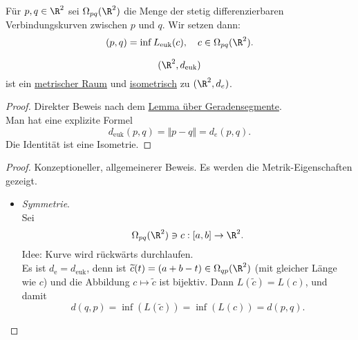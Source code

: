\begin{definition}
  Für \( p,q \in \R^2 \) sei \( \Omega_{pq}(\R^2) \) die Menge der stetig differenzierbaren Verbindungskurven zwischen \( p \) und \( q \). Wir setzen dann:
  \begin{equation*}
    (p,q) = \inf L_\text{euk}(c), \quad c \in \Omega_{pq}(\R^2)\text{.}
  \end{equation*}
\end{definition}

\begin{theorem}
  \begin{equation*}
    (\R^2, d_\text{euk})
  \end{equation*}
  ist ein \hyperref[def:metrischerRaum]{metrischer Raum} und \hyperref[def:isometrie]{isometrisch} zu \( (\R^2, d_e) \).
  \begin{proof}
    Direkter Beweis nach dem \hyperref[lemma:geradenkurz]{Lemma über Geradensegmente}. \\
    Man hat eine explizite Formel
    \begin{equation*}
      d_{\text{euk}}(p,q) = \Vert p - q \Vert = d_e(p,q)\text{.}
    \end{equation*}
    Die Identität ist eine Isometrie.
  \end{proof}
  \begin{proof}
    Konzeptioneller, allgemeinerer Beweis. Es werden die Metrik-Eigenschaften gezeigt.

    \begin{itemize}
      \item \emph{Symmetrie}. \\
        Sei
        \begin{equation*}
          \Omega_{pq}(\R^2) \ni c: [a,b] \to \R^2\text{.}
       \end{equation*}
       Idee: Kurve wird rückwärts durchlaufen. \\
       Es ist \( d_\text{e} = d_\text{euk} \), denn ist \( \widetilde{c}(t) = (a+b-t) \in \Omega_{qp}(\R^2) \) (mit gleicher Länge wie \( c \)) und die Abbildung \( c \mapsto \widetilde{c} \) ist bijektiv. Dann \( L(\widetilde{c}) = L(c) \), und damit
       \begin{equation*}
         d(q,p) = \inf(L(\widetilde{c})) = \inf(L(c)) = d(p,q)\text{.}
       \end{equation*}


\end{itemize}
\end{proof}
\end{theorem}
